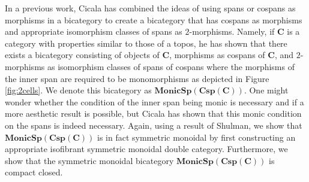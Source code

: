 \documentclass[11pt]{amsart}
\newcommand{\cat}[1]{\mathbf{#1}}
\theoremstyle{remark}
\theoremstyle{definition}
\begin{document}
In a previous work, Cicala \cite{Cic} has combined the ideas of using spans or cospans as morphisms in a bicategory to create a bicategory that has cospans as morphisms and appropriate isomorphism classes of spans as $2$-morphisms. Namely, if $\cat{C}$ is a category with properties similar to those of a topos, he has shown that there exists a bicategory consisting of objects of $\cat{C}$, morphisms as cospans of $\cat{C}$, and $2$-morphisms as isomorphism classes of spans of cospans where the morphisms of the inner span are required to be monomorphisms as depicted in Figure \ref{fig:2cells}. We denote this bicategory as $\cat{MonicSp(Csp(C))}$. One might wonder whether the condition of the inner span being monic is necessary and if a more aesthetic result is possible, but Cicala has shown that this monic condition on the spans is indeed necessary. Again, using a result of Shulman, we show that $\cat{MonicSp(Csp(C))}$ is in fact symmetric monoidal by first constructing an appropriate isofibrant symmetric monoidal double category. Furthermore, we show that the symmetric monoidal bicategory $\cat{MonicSp(Csp(C))}$ is compact closed.
\end{document}
